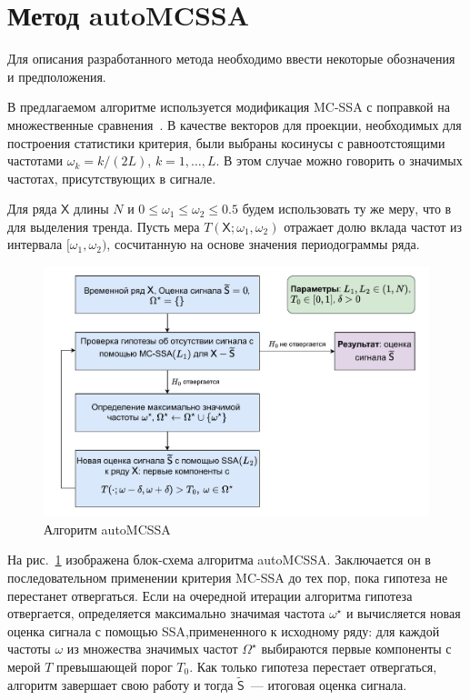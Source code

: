 \documentclass[12pt]{article}
\begin{document}

\section{Метод autoMCSSA}
Для описания разработанного метода необходимо ввести некоторые обозначения и предположения.

В предлагаемом алгоритме используется модификация MC-SSA с поправкой на множественные сравнения~\cite{Golyandina2023}. В качестве векторов для проекции, необходимых для построения статистики критерия, были выбраны косинусы с равноотстоящими частотами $\omega_k=k/(2L)$, $k=1,\ldots,L$. В этом случае можно говорить о значимых частотах, присутствующих в сигнале.

Для ряда $\mathsf{X}$ длины $N$ и $0\leqslant\omega_1\leqslant\omega_2\leqslant0.5$ будем использовать ту же меру, что в~\cite{alexandrov} для выделения тренда.
Пусть мера $T(\mathsf{X};\omega_1,\omega_2)$ отражает долю вклада частот из интервала $[\omega_1,\omega_2)$, сосчитанную на основе значения периодограммы ряда. 

\begin{figure}[htbp]
    \centering
    \includegraphics[width=\textwidth]{img/auto_mcssa_alg.pdf}
    \caption{Алгоритм autoMCSSA}
    \label{fig:autoMCSSA_alg}
\end{figure}

На рис.~\ref{fig:autoMCSSA_alg} изображена блок-схема алгоритма autoMCSSA. Заключается он в последовательном применении критерия MC-SSA до тех пор, пока гипотеза не перестанет отвергаться. Если на очередной итерации алгоритма гипотеза отвергается, определяется максимально значимая частота $\omega^\star$ и вычисляется новая оценка сигнала с помощью SSA,примененного к исходному ряду: для каждой частоты $\omega$ из множества значимых частот $\Omega^\star$ выбираются первые компоненты с мерой $T$ превышающей порог $T_0$. Как только гипотеза перестает отвергаться, алгоритм завершает свою работу и тогда $\widetilde{\mathsf{S}}$~--- итоговая оценка сигнала.
\end{document}
